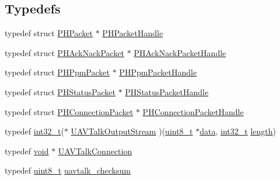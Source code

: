 \subsection*{Typedefs}
\begin{DoxyCompactItemize}
\item 
typedef struct \hyperlink{struct_p_h_packet}{P\-H\-Packet} $\ast$ \hyperlink{group___open_pilot_libraries_gaa252eac3dc3346fec375be8805fd8694}{P\-H\-Packet\-Handle}
\item 
typedef struct \hyperlink{struct_p_h_ack_nack_packet}{P\-H\-Ack\-Nack\-Packet} $\ast$ \hyperlink{group___open_pilot_libraries_gafd4ce42b4793fdd6ccdba127272056b4}{P\-H\-Ack\-Nack\-Packet\-Handle}
\item 
typedef struct \hyperlink{struct_p_h_ppm_packet}{P\-H\-Ppm\-Packet} $\ast$ \hyperlink{group___open_pilot_libraries_ga64fda6fd21f38899abc02e01a8920fe2}{P\-H\-Ppm\-Packet\-Handle}
\item 
typedef struct \hyperlink{struct_p_h_status_packet}{P\-H\-Status\-Packet} $\ast$ \hyperlink{group___open_pilot_libraries_gaba4b593b2564f247de7ae01fe86e908a}{P\-H\-Status\-Packet\-Handle}
\item 
typedef struct \hyperlink{struct_p_h_connection_packet}{P\-H\-Connection\-Packet} $\ast$ \hyperlink{group___open_pilot_libraries_ga2c36c280fa284ae25b54eba06a601805}{P\-H\-Connection\-Packet\-Handle}
\item 
typedef \hyperlink{group___n_a_m_e_gafd12020da5a235dfcf0c3c748fb5baed}{int32\-\_\-t}($\ast$ \hyperlink{group___open_pilot_libraries_ga0c67fb4d23157d56fe1982e4788938c7}{U\-A\-V\-Talk\-Output\-Stream} )(\hyperlink{stdint_8h_aba7bc1797add20fe3efdf37ced1182c5}{uint8\-\_\-t} $\ast$\hyperlink{pios__opahrs__proto_8h_a20e3f4bfaeccf09a75ef27e095a10112}{data}, \hyperlink{group___n_a_m_e_gafd12020da5a235dfcf0c3c748fb5baed}{int32\-\_\-t} \hyperlink{mavlink__helpers_8h_a4254bfa282bd215965d99b8d6b527a04}{length})
\item 
typedef \hyperlink{group___n_a_m_e_ga18028b8badbf1ea7e704ccac3c488e82}{void} $\ast$ \hyperlink{group___open_pilot_libraries_gaeff1721eaebd4ab306057b4017f23f36}{U\-A\-V\-Talk\-Connection}
\item 
typedef \hyperlink{stdint_8h_aba7bc1797add20fe3efdf37ced1182c5}{uint8\-\_\-t} \hyperlink{group___open_pilot_libraries_gad5ae4f5e5aa19ffb6f8e688a448e9618}{uavtalk\-\_\-checksum}
\end{DoxyCompactItemize}
